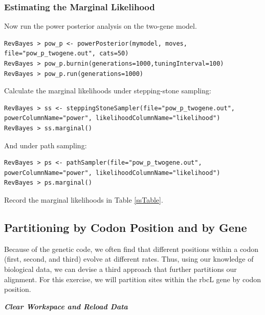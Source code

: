 \subsubsection*{Estimating the Marginal Likelihood}

Now run the power posterior analysis on the two-gene model.
{\tt \begin{snugshade*}
\begin{lstlisting}
RevBayes > pow_p <- powerPosterior(mymodel, moves, file="pow_p_twogene.out", cats=50) 
RevBayes > pow_p.burnin(generations=1000,tuningInterval=100)
RevBayes > pow_p.run(generations=1000)  
\end{lstlisting}
\end{snugshade*}}

Calculate the marginal likelihoods under stepping-stone sampling:
{\tt \begin{snugshade*}
\begin{lstlisting}
RevBayes > ss <- steppingStoneSampler(file="pow_p_twogene.out", powerColumnName="power", likelihoodColumnName="likelihood")
RevBayes > ss.marginal() 
\end{lstlisting}
\end{snugshade*}}

And under path sampling:
{\tt \begin{snugshade*}
\begin{lstlisting}
RevBayes > ps <- pathSampler(file="pow_p_twogene.out", powerColumnName="power", likelihoodColumnName="likelihood")
RevBayes > ps.marginal() 
\end{lstlisting}
\end{snugshade*}}

Record the marginal likelihoods in Table \ref{ssTable}.



\bigskip
\subsection{Partitioning by Codon Position and by Gene}\label{secExtremeP}

Because of the genetic code, we often find that different positions within a codon (first, second, and third) evolve at different rates.
Thus, using our knowledge of biological data, we can devise a third approach that further partitions our alignment. 
For this exercise, we will partition sites within the rbcL gene by codon position.

\textbf{\textit{Clear Workspace and Reload Data}}

